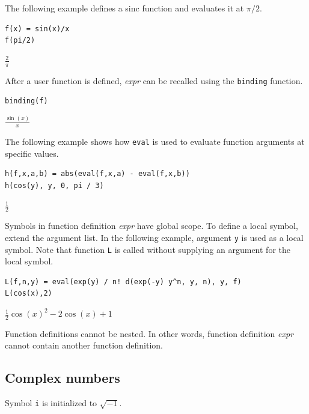 \documentclass[12pt]{article}
\begin{document}
\bigskip

The following example defines a sinc function and evaluates it at $\pi/2$.

{\color{blue}
\begin{verbatim}
f(x) = sin(x)/x
f(pi/2)
\end{verbatim}
}

$\displaystyle \frac{2}{\pi}$

\bigskip

After a user function is defined, {\it expr} can be recalled using the \verb$binding$ function.

{\color{blue}
\begin{verbatim}
binding(f)
\end{verbatim}
}

$\displaystyle \frac{\sin(x)}{x}$

\bigskip

The following example shows how \verb$eval$ is used to evaluate function arguments at specific values.

{\color{blue}
\begin{verbatim}
h(f,x,a,b) = abs(eval(f,x,a) - eval(f,x,b))
h(cos(y), y, 0, pi / 3)
\end{verbatim}
}

$\displaystyle \tfrac{1}{2}$

\bigskip

Symbols in function definition {\it expr} have global scope.
To define a local symbol, extend the argument list.
In the following example, argument \verb$y$ is used as a local symbol.
Note that function \verb$L$ is called without supplying an argument for the local symbol.

{\color{blue}
\begin{verbatim}
L(f,n,y) = eval(exp(y) / n! d(exp(-y) y^n, y, n), y, f)
L(cos(x),2)
\end{verbatim}
}

$\displaystyle \tfrac{1}{2}\cos(x)^2-2\cos(x)+1$

\bigskip

Function definitions cannot be nested.
In other words, function definition {\it expr} cannot contain another function definition.

\subsection{Complex numbers}

Symbol \verb$i$ is initialized to $\sqrt{-1}$.
\end{document}
